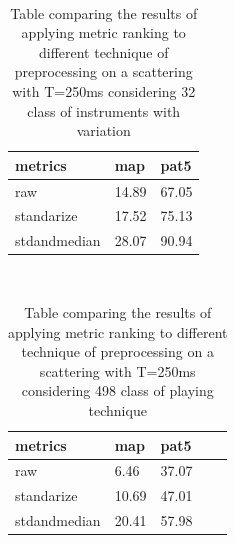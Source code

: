 \documentclass[hidelinks,12pt]{report}
\begin{document}
\begin{table}[H]
\begin{center} 
\ 
 \setlength{\tabcolsep}{.16667em} 
\begin{tabular}{|l|l|l|} 
metrics & map & pat5  \\ 
\hline 
raw & 14.89 & 67.05 \\ 
standarize & 17.52 & 75.13  \\ 
stdandmedian & 28.07 & 90.94  \\ 

\end{tabular} 
\end{center} 
\caption{Table comparing the results of applying metric ranking to different technique of preprocessing on a scattering with T=250ms considering 32 class of instruments with variation} 
\label{you} 
\end{table} 


\begin{table} [H]
\begin{center} 
\ 
 \setlength{\tabcolsep}{.16667em} 
\begin{tabular}{ | l | l | l | l | l | }
metrics & map & pat5  \\ 
\hline 
raw &  6.46 & 37.07  \\ 
standarize & 10.69 & 47.01  \\ 
stdandmedian & 20.41 & 57.98  \\ 
\end{tabular} 
\end{center}
\caption{Table comparing the results of applying metric ranking to different technique of preprocessing on a scattering with T=250ms considering 498 class of playing technique}
\end{table}
\end{document}
